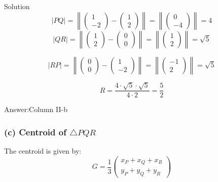 \documentclass{beamer}
\newcommand{\myvec}[1]{\ensuremath{\begin{pmatrix}#1\end{pmatrix}}}
\begin{document}
\begin{frame}{Solution}
\begin{equation}
	|PQ| = \left\|\myvec{1\\-2} - \myvec{1\\2}\right\| = \left\|\myvec{0\\-4}\right\| = 4
\end{equation}
\begin{equation}
	|QR| = \left\|\myvec{1\\2} - \myvec{0\\0}\right\| = \left\|\myvec{1\\2}\right\| = \sqrt{5}
\end{equation}

\begin{equation}
	|RP| = \left\|\myvec{0\\0} - \myvec{1\\-2}\right\| = \left\|\myvec{-1\\2}\right\| =\sqrt{5}
\end{equation}

\begin{equation}
	R = \frac{4 \cdot \sqrt{5} \cdot \sqrt{5}}{4 \cdot 2} = \frac{5}{2}
\end{equation}

Answer:Column II-b

\subsubsection*{(c) Centroid of $\triangle PQR$}

The centroid is given by:
\begin{equation}
	G = \frac{1}{3}\myvec{x_P + x_Q + x_R\\y_P + y_Q + y_R}
\end{equation}
\end{frame}
\end{document}

